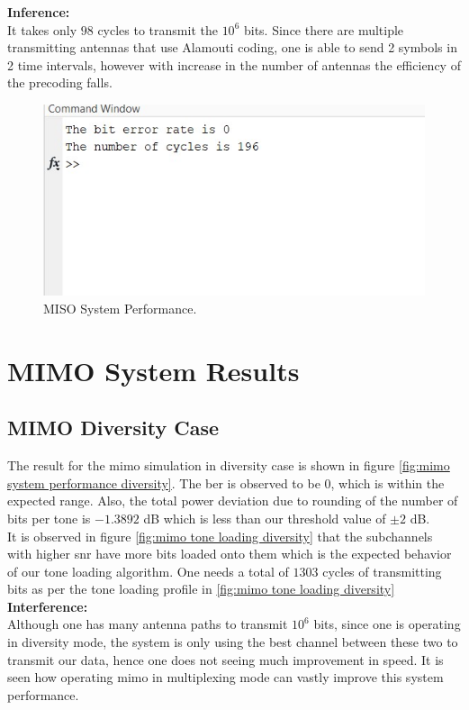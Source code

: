 \textbf{Inference:}\\
It takes only $98$ cycles to transmit the $10^6$ bits. Since there are multiple transmitting antennas that use Alamouti coding, one is able to send 2 symbols in 2 time intervals, however with increase in the number of antennas the efficiency of the precoding falls.


\begin{figure}[!htbp]
\centering
\includegraphics[scale=1]{Chapter 4/Figures/MISO System Performance}
\caption{MISO System Performance.}
\label{fig:miso system performance}
\end{figure}

\section{MIMO System Results}

\subsection{MIMO Diversity Case}
The result for the \acrshort{mimo} simulation in diversity case is shown in figure \ref{fig:mimo system performance diversity}. The \acrshort{ber} is observed to be $0$, which is within the expected range. Also, the total power deviation due to rounding of the number of bits per tone is $-1.3892$ dB which is less than our threshold value of $\pm 2$ dB.\\
It is observed in figure \ref{fig:mimo tone loading diversity} that the subchannels with higher \acrshort{snr} have more bits loaded onto them which is the expected behavior of our tone loading algorithm. One needs a total of $1303$ cycles of transmitting bits as per the tone loading profile in \ref{fig:mimo tone loading diversity}\\

\textbf{Interference:}\\
Although one has many antenna paths to transmit $10^6$ bits, since one is operating in diversity mode, the system is only using the best channel between these two to transmit our data, hence one does not seeing much improvement in speed. It is seen how operating \acrshort{mimo} in multiplexing mode can vastly improve this system performance.

